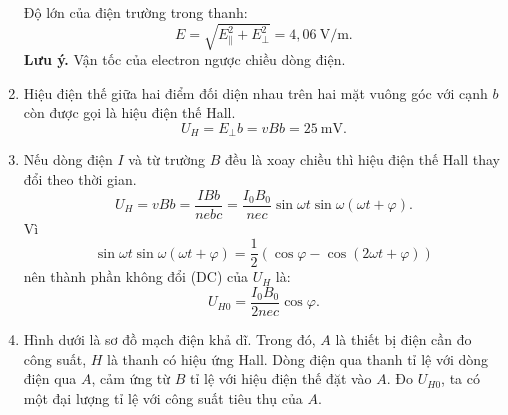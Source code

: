 \begin{loigiai}
\begin{enumerate}[1)]
    Độ lớn của điện trường trong thanh:
    \[E = \sqrt{E_\parallel^2 + E_\perp^2} = 4,06 ~\mathrm{V/m}.\]
    \textbf{Lưu ý.} Vận tốc của electron ngược chiều dòng điện.
    \item Hiệu điện thế giữa hai điểm đối diện nhau trên hai mặt vuông góc với cạnh $b$ còn được gọi là hiệu điện thế Hall.
    \[U_H = E_\perp b = vBb = 25~\mathrm{mV}. \]
    \item Nếu dòng điện $I$ và từ trường $B$ đều là xoay chiều thì hiệu điện thế Hall thay đổi theo thời gian.
    \[U_H = vBb = \dfrac{IBb}{nebc} = \dfrac{I_0B_0}{nec} \sin \omega t \sin \omega \left( \omega t + \varphi \right).\]
    Vì 
    \[\sin \omega t \sin \omega \left( \omega t + \varphi \right) = \dfrac{1}{2} \left( \cos \varphi - \cos \left( 2\omega t + \varphi \right) \right)\]
    nên thành phần không đổi (DC) của $U_H$ là:
    \[U_{H0} = \dfrac{I_0B_0}{2nec} \cos \varphi.\]
    \item Hình dưới là sơ đồ mạch điện khả dĩ. Trong đó, $A$ là thiết bị điện cần đo công suất, $H$ là thanh có hiệu ứng Hall. Dòng điện qua thanh tỉ lệ với dòng điện qua $A$, cảm ứng từ $B$ tỉ lệ với hiệu điện thế đặt vào $A$. Đo $U_{H0}$, ta có một đại lượng tỉ lệ với công suất tiêu thụ của $A$.
    \begin{center}
    


\begin{tikzpicture}[x=0.75pt,y=0.75pt,yscale=-1,xscale=1]


\end{tikzpicture}
\end{center}
\end{enumerate}
\end{loigiai}
